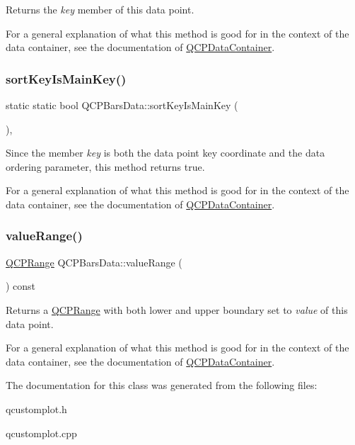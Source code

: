 Returns the {\itshape key} member of this data point.

For a general explanation of what this method is good for in the context of the data container, see the documentation of \hyperlink{class_q_c_p_data_container}{Q\+C\+P\+Data\+Container}. \mbox{\label{class_q_c_p_bars_data_aebaabda335bd4c9f81bd585d16b63aa8}} 
\subsubsection{\texorpdfstring{sort\+Key\+Is\+Main\+Key()}{sortKeyIsMainKey()}}
{\footnotesize\ttfamily static static bool Q\+C\+P\+Bars\+Data\+::sort\+Key\+Is\+Main\+Key (\begin{DoxyParamCaption}{ }\end{DoxyParamCaption})\hspace{0.3cm}{\ttfamily [inline]}, {\ttfamily [static]}}

Since the member {\itshape key} is both the data point key coordinate and the data ordering parameter, this method returns true.

For a general explanation of what this method is good for in the context of the data container, see the documentation of \hyperlink{class_q_c_p_data_container}{Q\+C\+P\+Data\+Container}. \mbox{\label{class_q_c_p_bars_data_acf3e6479dacacd6c81eebe7d4cd62185}} 
\subsubsection{\texorpdfstring{value\+Range()}{valueRange()}}
{\footnotesize\ttfamily \hyperlink{class_q_c_p_range}{Q\+C\+P\+Range} Q\+C\+P\+Bars\+Data\+::value\+Range (\begin{DoxyParamCaption}{ }\end{DoxyParamCaption}) const\hspace{0.3cm}{\ttfamily [inline]}}

Returns a \hyperlink{class_q_c_p_range}{Q\+C\+P\+Range} with both lower and upper boundary set to {\itshape value} of this data point.

For a general explanation of what this method is good for in the context of the data container, see the documentation of \hyperlink{class_q_c_p_data_container}{Q\+C\+P\+Data\+Container}. 

The documentation for this class was generated from the following files\+:\begin{DoxyCompactItemize}
\item 
qcustomplot.\+h\item 
qcustomplot.\+cpp\end{DoxyCompactItemize}
